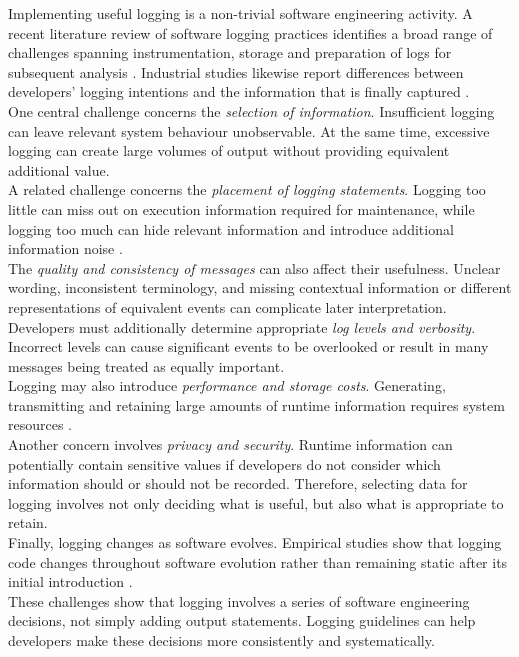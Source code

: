 Implementing useful logging is a non-trivial software engineering activity. 
A recent literature review of software logging practices identifies a broad range of challenges spanning 
instrumentation, storage and preparation of logs for subsequent analysis \cite{batoun2024aliteraturereview}. 
Industrial studies likewise report differences between developers' 
logging intentions and the information that is finally captured \cite{rong2020canyoucaputreinformation}.
\\
One central challenge concerns the \textit{selection of information}. 
Insufficient logging can leave relevant system behaviour unobservable. 
At the same time, excessive logging can create large volumes of output without providing equivalent additional value.
\\
A related challenge concerns the \textit{placement of logging statements}. 
Logging too little can miss out on execution information required for maintenance,  
while logging too much can hide relevant information and introduce additional information noise \cite{li2021whereshallwelog}.
\\
The \textit{quality and consistency of messages} can also affect their usefulness. 
Unclear wording, inconsistent terminology, and missing contextual information 
or different representations of equivalent events can complicate later interpretation.
\\
Developers must additionally determine appropriate \textit{log levels and verbosity}. 
Incorrect levels can cause significant events to be overlooked or result in many messages being treated as equally important.
\\
Logging may also introduce \textit{performance and storage costs}. 
Generating, transmitting and retaining large amounts of runtime information requires system resources \cite{gholamian2021whatdistributedsystemssay}.
\\
Another concern involves \textit{privacy and security}. Runtime information can potentially contain sensitive 
values if developers do not consider which information should or should not be recorded. Therefore, 
selecting data for logging involves not only deciding what is useful, but also what is appropriate to retain.
\\
Finally, logging changes as software evolves. 
Empirical studies show that logging code changes throughout software evolution rather 
than remaining static after its initial introduction \cite{yuan2012characterzingloggingpractices,chen2017characterizingloggingpractices}.
\\
These challenges show that logging involves a series of software engineering decisions, not simply adding output statements. 
Logging guidelines can help developers make these decisions more consistently and systematically.


